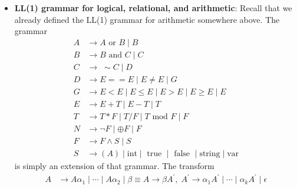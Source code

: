 \documentclass{report}
\begin{document}
\begin{itemize}
\begin{align*}
            E &\to F < F \mid F \leq F \mid F > F \mid F \geq F \mid F \\
            D^{\prime} &\to F == F \mid F \ne F \mid E^{\prime}\\
            E^{\prime} &\to F < F \mid F \leq F \mid F > F \mid F \geq F \mid Z\\
            Z &\to (A) \mid \text{ true } \mid \text{ false } \\
            F &\to F + G \mid F - G \mid G\\
            G &\to G * H \mid G / H \mid G \text{ mod } H \mid H\\
            H &\to \neg I \mid \oplus I \mid I\\
            I &\to I \land J \mid J\\
            J &\to (F) \mid \text{int} 
        .\end{align*}
        Although it's best to maintain strict separation between parsing and semantic analyzing. Let grammars / parsing shape the language, and the semantic analyzer check if statements that assume that shape make sense.
    \item \textbf{LL(1) grammar for logical, relational, and arithmetic}: Recall that we already defined the LL(1) grammar for arithmetic somewhere above. The grammar 
        \begin{align*}
            A &\to A \text{ or } B \mid B\\
            B &\to B \text{ and } C \mid C\\
            C &\to\; \sim C \mid D \\
            D &\to E == E \mid E \ne E \mid G\\
            G &\to E < E \mid E \leq E \mid E > E \mid E \geq E \mid E \\
            E &\to E + T \mid E - T \mid T\\
            T &\to T * F \mid T / F \mid T \text{ mod } F \mid F\\
            N &\to \neg F \mid \oplus F \mid F\\
            F &\to F \land S \mid S\\
            S &\to (A) \mid \text{int} \mid \text{ true } \mid \text{ false } \mid \text{string} \mid \text{var}
        \end{align*}
        is simply an extension of that grammar. The transform 
        \begin{align*}
            A &\to A\alpha_{1} \mid \cdots \mid A\alpha_{2} \mid \beta \equiv A \to \beta A^{\prime},\; A^{\prime} \to \alpha_{1}A^{\prime} \mid \cdots \mid \alpha_{k}A^{\prime} \mid \epsilon

\end{align*}
\end{itemize}
\end{document}
